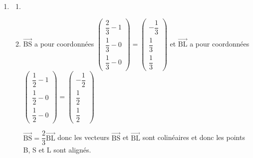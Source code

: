 \documentclass[10pt]{article}
\providecommand{\vectt}[1]{\overrightarrow{\mathrm{#1}}}
\begin{document}
\begin{enumerate}
$\vectt{AB}\cdot \vectt{BG} = 1\times 0 + 0\times 1 + 0\times 1 = 0$
donc $\vectt{AB}\perp \vectt{BG}$ donc le triangle ABG est rectangle en B.

	\item
		\begin{enumerate}
			\item
{}
			\item 
$\vectt{BS}$ a pour coordonnées  
$\begin{pmatrix}
\dfrac{2}{3} - 1 \\[5pt] 
\dfrac{1}{3} - 0 \\[5pt] 
\dfrac{1}{3} - 0
\end{pmatrix}
=
\begin{pmatrix}
-\dfrac{1}{3} \\[5pt] 
\dfrac{1}{3}  \\[5pt] 
\dfrac{1}{3} 
\end{pmatrix}$
et  $\vectt{BL}$ a pour coordonnées
$\begin{pmatrix}
\dfrac{1}{2} - 1 \\[5pt] 
\dfrac{1}{2} - 0 \\[5pt] 
\dfrac{1}{2} - 0
\end{pmatrix}
=
\begin{pmatrix}
-\dfrac{1}{2} \\[5pt]
\dfrac{1}{2} \\[5pt]
\dfrac{1}{2} 
\end{pmatrix}$

$\vectt{BS} = \dfrac{2}{3} \vectt{BL}$ donc les vecteurs $\vectt{BS}$ et $\vectt{BL}$ sont colinéaires et donc les points B, S et L sont alignés.

		\end{enumerate}
	\end{enumerate}
\end{document}
